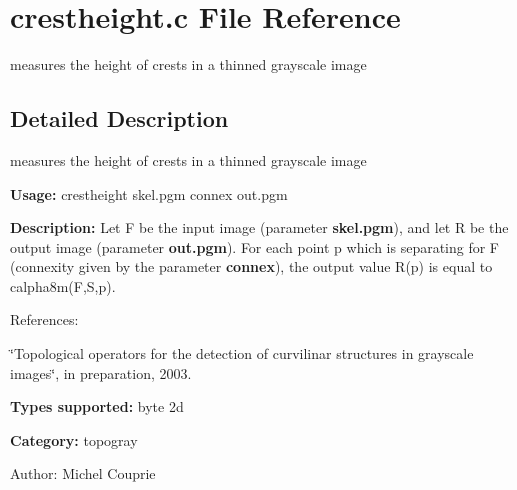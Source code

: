 \section{crestheight.c File Reference}
\label{crestheight_8c}
measures the height of crests in a thinned grayscale image  




\label{_details}
\subsection{Detailed Description}
measures the height of crests in a thinned grayscale image 

{\bf Usage:} crestheight skel.pgm connex out.pgm

{\bf Description:} Let F be the input image (parameter {\bf skel.pgm}), and let R be the output image (parameter {\bf out.pgm}). For each point p which is separating for F (connexity given by the parameter {\bf connex}), the output value R(p) is equal to calpha8m(F,S,p).

References:\par
 \char`\"{}Topological operators for the detection of curvilinar structures in grayscale images\char`\"{}, in preparation, 2003.

{\bf Types supported:} byte 2d

{\bf Category:} topogray

\begin{Desc}
\item[Author:]Michel Couprie \end{Desc}
